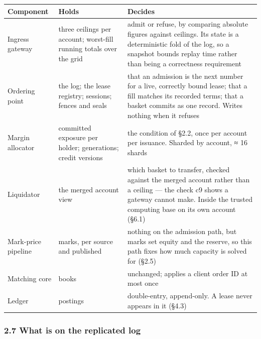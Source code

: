 \documentclass[10pt,a4paper]{article}
\newcounter{none}  %
\begin{document}
{\def\LTcaptype{none} %
\begin{longtable}[]{@{}
  >{\raggedright\arraybackslash}p{}
  >{\raggedright\arraybackslash}p{}
  >{\raggedright\arraybackslash}p{}@{}}
\toprule\noalign{}
\begin{minipage}[b]{\linewidth}\raggedright
Component
\end{minipage} & \begin{minipage}[b]{\linewidth}\raggedright
Holds
\end{minipage} & \begin{minipage}[b]{\linewidth}\raggedright
Decides
\end{minipage} \\
\midrule\noalign{}
\endhead
\bottomrule\noalign{}
\endlastfoot
Ingress gateway & three ceilings per account; worst-fill running totals over the grid & admit or refuse, by comparing absolute figures against ceilings. Its state is a deterministic fold of the log, so a snapshot bounds replay time rather than being a correctness requirement \\
Ordering point & the log; the lease registry; sessions; fences and seals & that an admission is the next number for a live, correctly bound lease; that a fill matches its recorded terms; that a basket commits as one record. Writes nothing when it refuses \\
Margin allocator & committed exposure per holder; generations; credit versions & the condition of §2.2, once per account per issuance. Sharded by account, ≈ 16 shards \\
Liquidator & the merged account view & which basket to transfer, checked against the merged account rather than a ceiling --- the check c9 shows a gateway cannot make. Inside the trusted computing base on its own account (§6.1) \\
Mark-price pipeline & marks, per source and published & nothing on the admission path, but marks set equity and the reserve, so this path fixes how much capacity is solved for (§2.5) \\
Matching core & books & unchanged; applies a client order ID at most once \\
Ledger & postings & double-entry, append-only. A lease never appears in it (§4.3) \\
\end{longtable}
}

\subsubsection{2.7 What is on the replicated log}\label{what-is-on-the-replicated-log}
\end{document}
